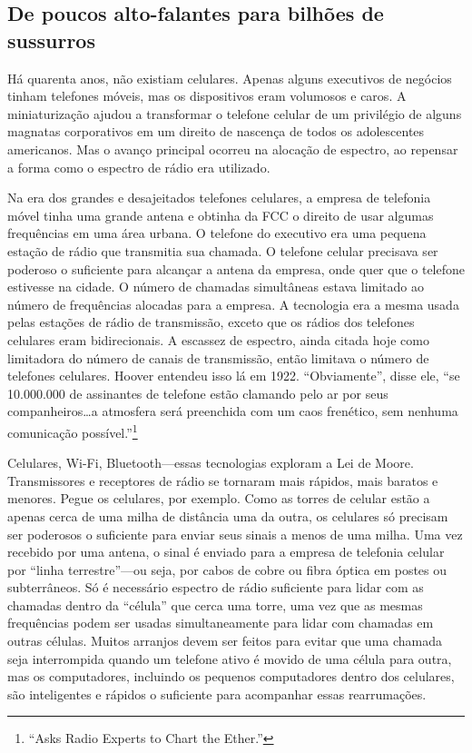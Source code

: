 \documentclass{book}
\begin{document}
\subsection{De poucos alto-falantes para bilhões de sussurros}
\label{cap8:os-caminho-pouco}
Há quarenta anos, não existiam celulares. Apenas alguns executivos de negócios
tinham telefones móveis, mas os dispositivos eram volumosos e caros. A
miniaturização ajudou a transformar o telefone celular de um privilégio de alguns
magnatas corporativos em um direito de nascença de todos os adolescentes
americanos. Mas o avanço principal ocorreu na alocação de espectro, ao repensar
a forma como o espectro de rádio era utilizado.

Na era dos grandes e desajeitados telefones celulares, a empresa de telefonia
móvel tinha uma grande antena e obtinha da FCC o direito de usar algumas
frequências em uma área urbana. O telefone do executivo era uma pequena estação
de rádio que transmitia sua chamada. O telefone celular precisava ser poderoso o
suficiente para alcançar a antena da empresa, onde quer que o telefone estivesse
na cidade. O número de chamadas simultâneas estava limitado ao número de
frequências alocadas para a empresa. A tecnologia era a mesma usada pelas estações
de rádio de transmissão, exceto que os rádios dos telefones celulares eram
bidirecionais. A escassez de espectro, ainda citada hoje como limitadora do número
de canais de transmissão, então limitava o número de telefones celulares. Hoover
entendeu isso lá em 1922. ``Obviamente'', disse ele, ``se 10.000.000 de assinantes
de telefone estão clamando pelo ar por seus companheiros\ldots a atmosfera será
preenchida com um caos frenético, sem nenhuma comunicação 
possível.''\footnote{``Asks Radio Experts to Chart the Ether.''}

Celulares, Wi-Fi, Bluetooth---essas tecnologias exploram a Lei de Moore.
Transmissores e receptores de rádio se tornaram mais rápidos, mais baratos e
menores. Pegue os celulares, por exemplo. Como as torres de celular estão a apenas
cerca de uma milha de distância uma da outra, os celulares só precisam ser
poderosos o suficiente para enviar seus sinais a menos de uma milha. Uma vez
recebido por uma antena, o sinal é enviado para a empresa de telefonia celular
por ``linha terrestre''---ou seja, por cabos de cobre ou fibra óptica em postes
ou subterrâneos. Só é necessário espectro de rádio suficiente para lidar com as
chamadas dentro da ``célula'' que cerca uma torre, uma vez que as mesmas
frequências podem ser usadas simultaneamente para lidar com chamadas em outras
células. Muitos arranjos devem ser feitos para evitar que uma chamada seja
interrompida quando um telefone ativo é movido de uma célula para outra, mas os
computadores, incluindo os pequenos computadores dentro dos celulares, são
inteligentes e rápidos o suficiente para acompanhar essas rearrumações.
\end{document}
